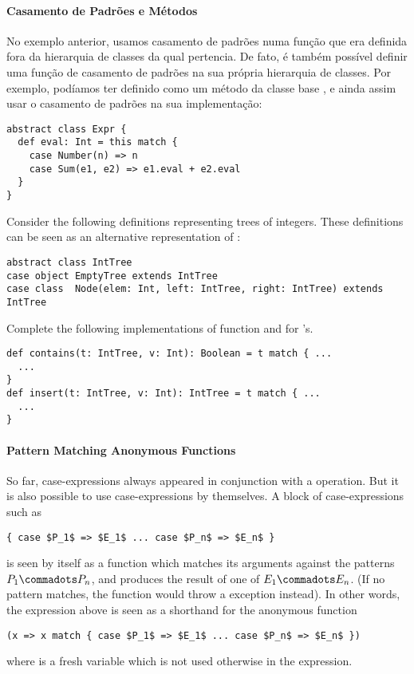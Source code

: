 \paragraph{Casamento de Padrões e Métodos}
No exemplo anterior, usamos casamento de padrões numa função que era definida fora da 
hierarquia de classes da qual pertencia. De fato, é também possível definir uma função 
de casamento de padrões na sua própria hierarquia de classes. Por exemplo, podíamos 
ter definido  como um método da classe base , e ainda assim usar o 
casamento de padrões na sua implementação:

\begin{lstlisting}
abstract class Expr { 
  def eval: Int = this match {
    case Number(n) => n
    case Sum(e1, e2) => e1.eval + e2.eval 
  } 
}
\end{lstlisting}

\begin{exercise} Consider the following definitions representing trees
of integers.  These definitions can be seen as an alternative
representation of :
\begin{lstlisting}
abstract class IntTree
case object EmptyTree extends IntTree
case class  Node(elem: Int, left: IntTree, right: IntTree) extends IntTree
\end{lstlisting}
Complete the following implementations of function  and  for 
's.
\begin{lstlisting}
def contains(t: IntTree, v: Int): Boolean = t match { ...
  ...
}
def insert(t: IntTree, v: Int): IntTree = t match { ...
  ...
}
\end{lstlisting}
\end{exercise}

\paragraph{Pattern Matching Anonymous Functions}

So far, case-expressions always appeared in conjunction with a
\verb@match@ operation. But it is also possible to use
case-expressions by themselves. A block of case-expressions such as
\begin{lstlisting}
{ case $P_1$ => $E_1$ ... case $P_n$ => $E_n$ }
\end{lstlisting}
is seen by itself as a function which matches its arguments
against the patterns $P_1 \commadots P_n$, and produces the result of
one of $E_1 \commadots E_n$. (If no pattern matches, the function
would throw a  exception instead).
In other words, the expression above is seen as a shorthand for the anonymous function
\begin{lstlisting}
(x => x match { case $P_1$ => $E_1$ ... case $P_n$ => $E_n$ })
\end{lstlisting}
where  is a fresh variable which is not used 
otherwise in the expression.

